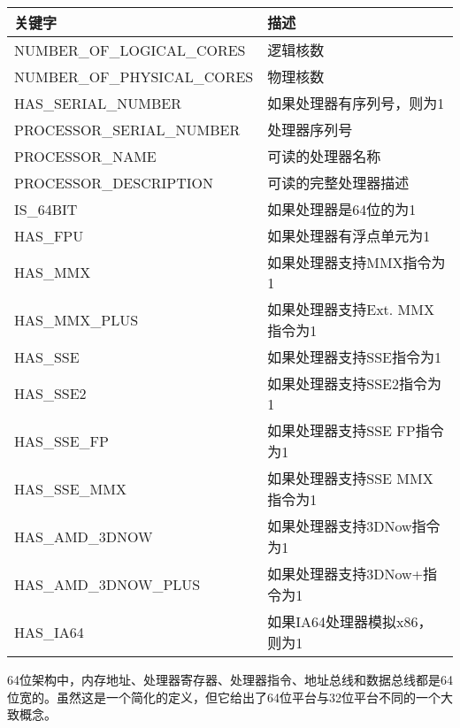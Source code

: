 \begin{longtable}{|l|l|}
\hline
\textbf{关键字}                & \textbf{描述}                                   \\ \hline
\endfirsthead
%
\endhead
%
NUMBER\_OF\_LOGICAL\_CORES  & 逻辑核数                       \\ \hline
NUMBER\_OF\_PHYSICAL\_CORES & 物理核数                      \\ \hline
HAS\_SERIAL\_NUMBER         & 如果处理器有序列号，则为1        \\ \hline
PROCESSOR\_SERIAL\_NUMBER   & 处理器序列号                       \\ \hline
PROCESSOR\_NAME             & 可读的处理器名称                 \\ \hline
PROCESSOR\_DESCRIPTION      & 可读的完整处理器描述     \\ \hline
IS\_64BIT                   & 如果处理器是64位的为1                      \\ \hline
HAS\_FPU                    & 如果处理器有浮点单元为1     \\ \hline
HAS\_MMX                    & 如果处理器支持MMX指令为1      \\ \hline
HAS\_MMX\_PLUS              & 如果处理器支持Ext. MMX指令为1 \\ \hline
HAS\_SSE                    & 如果处理器支持SSE指令为1      \\ \hline
HAS\_SSE2                   & 如果处理器支持SSE2指令为1     \\ \hline
HAS\_SSE\_FP                & 如果处理器支持SSE FP指令为1   \\ \hline
HAS\_SSE\_MMX               & 如果处理器支持SSE MMX指令为1  \\ \hline
HAS\_AMD\_3DNOW             & 如果处理器支持3DNow指令为1    \\ \hline
HAS\_AMD\_3DNOW\_PLUS       & 如果处理器支持3DNow+指令为1   \\ \hline
HAS\_IA64                   & 如果IA64处理器模拟x86，则为1          \\ \hline
\end{longtable}


64位架构中，内存地址、处理器寄存器、处理器指令、地址总线和数据总线都是64位宽的。虽然这是一个简化的定义，但它给出了64位平台与32位平台不同的一个大致概念。

